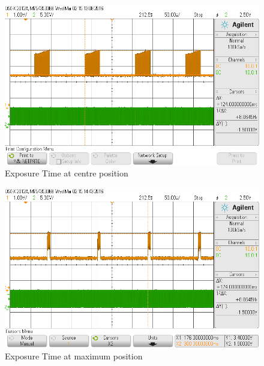 \begin{figure}[H]
\begin{center}
\includegraphics[scale=0.4]{LabFour/scope_65}
\end{center}
\caption{Exposure Time at centre position}
\label{fig:expos1}
\end{figure}

\begin{figure}[H]
\begin{center}
\includegraphics[scale=0.4]{LabFour/scope_67}
\end{center}
\caption{Exposure Time at maximum position}
\label{fig:expos2}
\end{figure}

